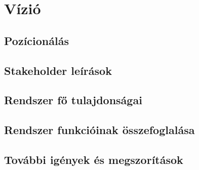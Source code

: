 \chapter{Vízió}\label{sect:Vision}
\section{Pozícionálás}

\section{Stakeholder leírások}

\section{Rendszer fő tulajdonságai}

\section{Rendszer funkcióinak összefoglalása}

\section{További igények és megszorítások}
